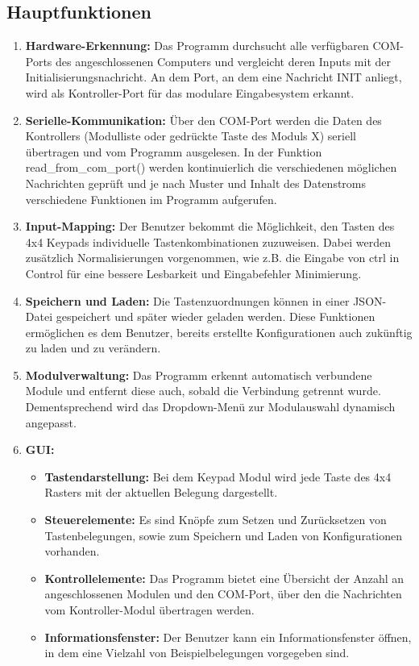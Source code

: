 \subsection{Hauptfunktionen}
\begin{enumerate}
    \item \textbf{Hardware-Erkennung:} Das Programm durchsucht alle verfügbaren COM-Ports des angeschlossenen Computers und vergleicht deren Inputs mit der Initialisierungsnachricht. An dem Port, an dem eine Nachricht \glqq INIT\grqq{} anliegt, wird als Kontroller-Port für das modulare Eingabesystem erkannt.
    \item \textbf{Serielle-Kommunikation:} Über den COM-Port werden die Daten des Kontrollers (Modulliste oder gedrückte Taste des Moduls X) seriell übertragen und vom Programm ausgelesen. In der Funktion \glqq read\_from\_com\_port()\grqq{} werden kontinuierlich die verschiedenen möglichen Nachrichten geprüft und je nach Muster und Inhalt des Datenstroms verschiedene Funktionen im Programm aufgerufen.
    \item \textbf{Input-Mapping:} Der Benutzer bekommt die Möglichkeit, den Tasten des 4x4 Keypads individuelle Tastenkombinationen zuzuweisen. Dabei werden zusätzlich Normalisierungen vorgenommen, wie z.B. die Eingabe von \glqq ctrl\grqq{} in \glqq Control\grqq{} für eine bessere Lesbarkeit und Eingabefehler Minimierung.
    \item \textbf{Speichern und Laden:} Die Tastenzuordnungen können in einer JSON-Datei gespeichert und später wieder geladen werden. Diese Funktionen ermöglichen es dem Benutzer, bereits erstellte Konfigurationen auch zukünftig zu laden und zu verändern.
    \item \textbf{Modulverwaltung:} Das Programm erkennt automatisch verbundene Module und entfernt diese auch, sobald die Verbindung getrennt wurde. Dementsprechend wird das Dropdown-Menü zur Modulauswahl dynamisch angepasst.
    \newpage
    \item \textbf{GUI:}
        \begin{itemize}
            \item \textbf{Tastendarstellung:} Bei dem Keypad Modul wird jede Taste des 4x4 Rasters mit der aktuellen Belegung dargestellt.
            \item \textbf{Steuerelemente:} Es sind Knöpfe zum Setzen und Zurücksetzen von Tastenbelegungen, sowie zum Speichern und Laden von Konfigurationen vorhanden.
            \item \textbf{Kontrollelemente:} Das Programm bietet eine Übersicht der Anzahl an angeschlossenen Modulen und den COM-Port, über den die Nachrichten vom Kontroller-Modul übertragen werden.
            \item \textbf{Informationsfenster:} Der Benutzer kann ein Informationsfenster öffnen, in dem eine Vielzahl von Beispielbelegungen vorgegeben sind.
        \end{itemize}
\end{enumerate}

